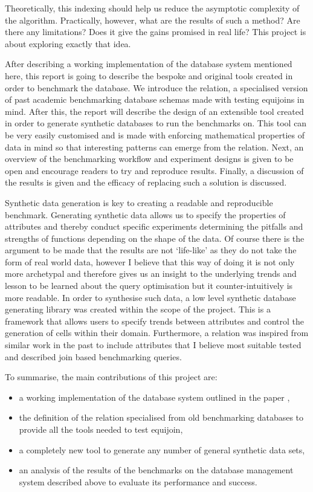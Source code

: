 Theoretically, this indexing should help us reduce the asymptotic complexity of
the algorithm. Practically, however, what are the results of such a method? Are
there any limitations? Does it give the gains promised  in real life? This
project is about exploring exactly that idea.

After describing a working implementation of the database system mentioned here,
this report is going to describe the bespoke and original tools created in order
to benchmark the database. We introduce the  relation, a
specialised version of past academic benchmarking database schemas made with
testing equijoins in mind. After this, the report will describe the design of
an extensible tool created in order to generate synthetic databases to run the
benchmarks on. This tool can be very easily customised and is made with enforcing
mathematical properties of data in mind so that interesting patterns can emerge
from the  relation. Next, an overview of the benchmarking
workflow and experiment designs is given to be open and encourage readers to try
and reproduce results. Finally, a discussion of the results is given and the
efficacy of replacing such a solution is discussed.

Synthetic data generation is key to creating a readable and reproducible
benchmark. Generating synthetic data allows us to specify the properties of
attributes and thereby conduct specific experiments determining the pitfalls and
strengths of functions depending on the shape of the data. Of course there is
the argument to be made that the results are not `life-like' as they do not take
the form of real world data, however I believe that this way of doing it is not
only more archetypal and therefore gives us an insight to the underlying trends
and lesson to be learned about the query optimisation but it counter-intuitively
is more readable. In order to synthesise such data, a low level synthetic
database generating library was created within the scope of the project. This is
a framework that allows users to specify trends between attributes and control
the generation of cells within their domain. Furthermore, a 
relation was inspired from similar work in the past to include attributes that I
believe most suitable tested and described join based benchmarking queries.

To summarise, the main contributions of this project are:
\begin{itemize}
    \item a working implementation of the database system outlined in the paper
        \relalg{},
    \item the definition of the  relation specialised from
        old benchmarking databases to provide all the tools needed to test
        equijoin,
    \item a completely new tool to generate any number of general synthetic data
        sets,
    \item an analysis of the results of the benchmarks on the database
        management system described above to evaluate its performance and
        success.
\end{itemize}
